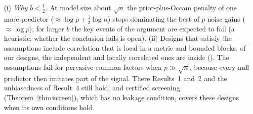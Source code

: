 \begin{remark}\label{rem:reported}
(i) \emph{Why $b<\tfrac12$.} At model size about $\sqrt n$ the prior-plus-Occam penalty of one more predictor
($\approx\log p+\tfrac12\log n$) stops dominating the best of $p$ noise gains ($\approx\log p$); for larger $b$ the key events of the argument are
expected to fail (a heuristic; whether the conclusion fails is open).
(ii) Designs that satisfy the assumptions include correlation that is local in a metric and bounded blocks; of our
designs, the independent and locally correlated ones are inside (). The assumptions fail for pervasive common factors when
$p\gg\sqrt n$, because every null predictor then imitates part of the signal. There Results~1 and~2 and the
unbiasedness of Result~4 still hold, and certified screening (Theorem~\ref{thm:screen}), which has no leakage
condition, covers these designs when its own conditions hold.
\end{remark}
